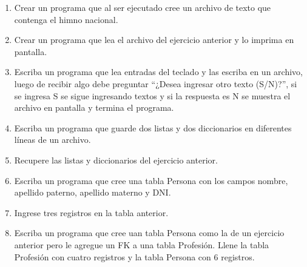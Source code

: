 \begin{enumerate}
\item Crear un programa que al ser ejecutado cree un archivo de texto que contenga el himno nacional.

\item Crear un programa que lea el archivo del ejercicio anterior y lo imprima en pantalla.

\item Escriba un programa que lea entradas del teclado y las escriba en un archivo, luego de recibir algo debe preguntar ``¿Desea ingresar otro texto (S/N)?'', si se ingresa S se sigue ingresando textos y si la respuesta es N se muestra el archivo en pantalla y termina el programa.

\item Escriba un programa que guarde dos listas y dos diccionarios en diferentes líneas de un archivo.

\item Recupere las listas y diccionarios del ejercicio anterior.

\item Escriba un programa que cree una tabla Persona con los campos nombre, apellido paterno, apellido materno y DNI.

\item Ingrese tres registros en la tabla anterior.

\item Escriba un programa que cree uan tabla Persona como la de un ejercicio anterior pero le agregue un FK a una tabla Profesión. Llene la tabla Profesión con cuatro registros y la tabla Persona con 6 registros.
\end{enumerate}

